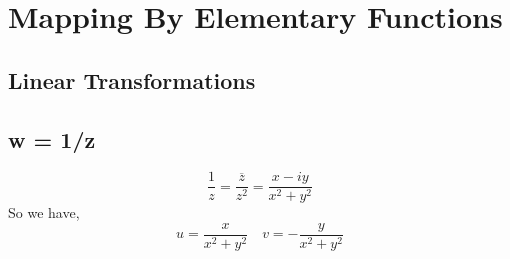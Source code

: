 \chapter{Mapping By Elementary Functions}

\section{Linear Transformations}

\section{w = 1/z}

$$ \frac{1}{z} = \frac{\overline{z}}{z^2} = \frac{x-iy}{x^2 +y^2} $$ 
So we have, 
$$ u = \frac{x}{x^2+y^2}\quad v = -\frac{y}{x^2+y^2}$$ 


